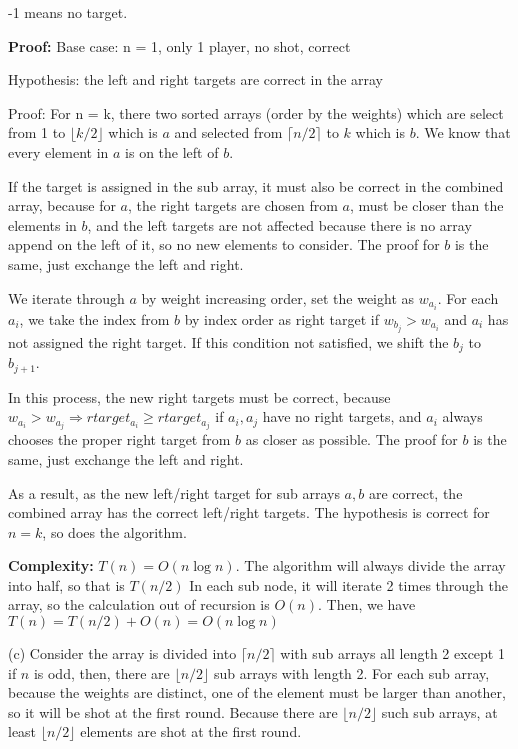 \documentclass{article}
\begin{document}
\begin{enumerate}[topsep=0pt]
-1 means no target.

\textbf{Proof:}
Base case: n = 1, only 1 player, no shot, correct

Hypothesis: the left and right targets are correct in the array

Proof: For n = k, there two sorted arrays (order by the weights) which are select from 1 to $\lfloor k / 2 \rfloor$ which is $a$
and selected from $\lceil n / 2 \rceil$ to $k$ which is $b$. We know that every element in $a$ is on the left of $b$.

If the target is assigned in the sub array, it must also be correct in the combined array, because for $a$,
the right targets are chosen from $a$, must be closer than the elements in $b$, and the left targets are not affected
because there is no array append on the left of it, so no new elements to consider.
The proof for $b$ is the same, just exchange the left and right.

We iterate through $a$ by weight increasing order, set the weight as $w_{a_i}$. 
For each $a_i$, we take the index from $b$ by index order as right target if $w_{b_j}>w_{a_i}$ and 
$a_i$ has not assigned the right target. If this condition not satisfied, we shift the $b_j$ to $b_{j+1}$.

In this process, the new right targets must be correct, because $w_{a_i}>w_{a_j}\Rightarrow rtarget_{a_i}\ge rtarget_{a_j}$ if $a_i,a_j$ have no right targets,
and $a_i$ always chooses the proper right target from $b$ as closer as possible.
The proof for $b$ is the same, just exchange the left and right.

As a result, as the new left/right target for sub arrays $a,b$ are correct, the combined array has the correct left/right targets. 
The hypothesis is correct for $n=k$, so does the algorithm.

\textbf{Complexity:}
$T(n)=O(n\log{n})$. The algorithm will always divide the array into half, so that is $T(n/2)$
In each sub node, it will iterate 2 times through the array, so the calculation out of recursion is $O(n)$.
Then, we have $T(n)=T(n/2)+O(n)=O(n\log{n})$

(c) Consider the array is divided into $\lceil n/2\rceil$ with sub arrays all length 2 except 1 if $n$ is odd, 
then, there are $\lfloor n/2 \rfloor$ sub arrays with length 2.
For each sub array, because the weights are distinct, one of the element must be larger than another,
so it will be shot at the first round. Because there are $\lfloor n/2 \rfloor$ such sub arrays,
at least  $\lfloor n/2 \rfloor$ elements are shot at the first round.


\end{enumerate}
\end{document}
